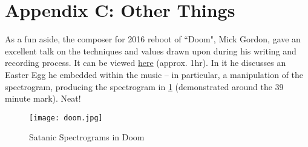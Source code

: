 \documentclass[journal]{IEEEtran}
\begin{document}
\section{Appendix C: Other Things}
As a fun aside, the composer for 2016 reboot of ``Doom", Mick Gordon, gave an excellent talk on the techniques
and values drawn upon during his writing and recording process. It can be viewed \href{https://youtu.be/U4FNBMZsqrY}{here}
(approx. 1hr). In it he discusses an Easter Egg he embedded within the music -- in particular, a manipulation of the
spectrogram, producing the spectrogram in \ref{doom} (demonstrated around the 39 minute mark). Neat!
\begin{figure}[h!]
	\centerline{\texttt{[image: doom.jpg]}}
	\caption{Satanic Spectrograms in Doom}
	\label{doom}
\end{figure}
\end{document}
